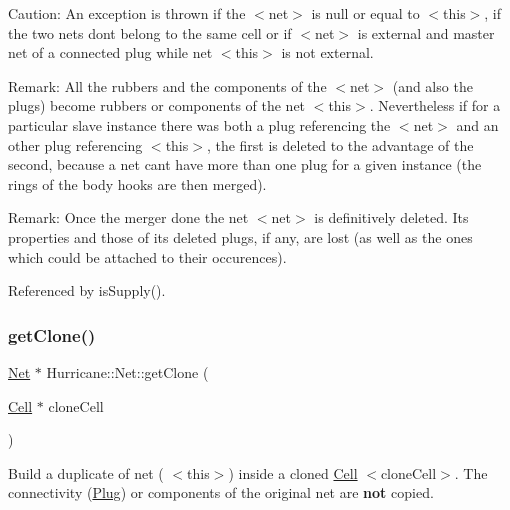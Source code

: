 \begin{DoxyParagraph}{Caution\+:}
An exception is thrown if the {\ttfamily $<$net$>$} is null or equal to {\ttfamily $<$this$>$}, if the two nets don\textquotesingle{}t belong to the same cell or if {\ttfamily $<$net$>$} is external and master net of a connected plug while net {\ttfamily $<$this$>$} is not external.
\end{DoxyParagraph}
\begin{DoxyParagraph}{Remark\+:}
All the rubbers and the components of the {\ttfamily $<$net$>$} (and also the plugs) become rubbers or components of the net {\ttfamily $<$this$>$}. Nevertheless if for a particular slave instance there was both a plug referencing the {\ttfamily $<$net$>$} and an other plug referencing {\ttfamily $<$this$>$}, the first is deleted to the advantage of the second, because a net can\textquotesingle{}t have more than one plug for a given instance (the rings of the body hooks are then merged).
\end{DoxyParagraph}
\begin{DoxyParagraph}{Remark\+:}
Once the merger done the net {\ttfamily $<$net$>$} is definitively deleted. Its properties and those of its deleted plugs, if any, are lost (as well as the ones which could be attached to their occurences). 
\end{DoxyParagraph}


Referenced by is\+Supply().

\mbox{\label{classHurricane_1_1Net_a4bd27e6ae22606463491c28437c4068f}} 
\subsubsection{\texorpdfstring{get\+Clone()}{getClone()}}
{\footnotesize\ttfamily \hyperlink{classHurricane_1_1Net}{Net} $\ast$ Hurricane\+::\+Net\+::get\+Clone (\begin{DoxyParamCaption}\item[{\hyperlink{classHurricane_1_1Cell}{Cell} $\ast$}]{clone\+Cell }\end{DoxyParamCaption})}

Build a duplicate of net ({\ttfamily } $<$this$>$) inside a cloned \hyperlink{classHurricane_1_1Cell}{Cell} {\ttfamily } $<$clone\+Cell$>$. The connectivity (\hyperlink{classHurricane_1_1Plug}{Plug}) or components of the original net are {\bfseries not} copied.

